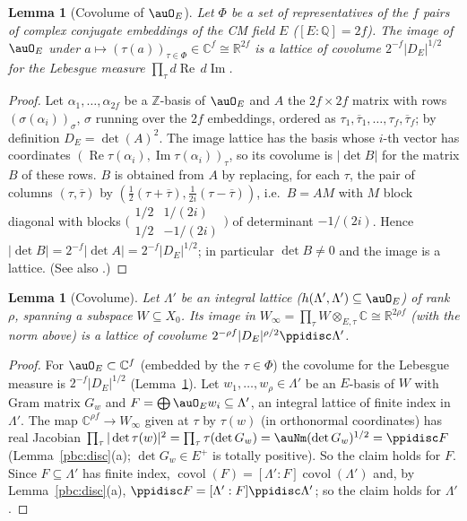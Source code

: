 \documentclass[10pt]{amsart}
\newtheorem{lemma}[theorem]{Lemma}
\theoremstyle{definition}
\theoremstyle{remark}
\newcommand{\C}{\mathbb C}
\newcommand{\R}{\mathbb R}
\newcommand{\Z}{\mathbb Z}
\newcommand{\Q}{\mathbb Q}
\newcommand{\Rel}{\operatorname{Re}}
\newcommand{\Iml}{\operatorname{Im}}
\providecommand{\auPl}{\Phi}
\providecommand{\aubar}[1]{\overline{#1}}
\begin{document}
\begin{lemma}[Covolume of $\auO_E$]\label{pbc:tb-covol}
Let $\auPl$ be a set of representatives of the $f$ pairs of complex conjugate embeddings of the CM
field $E$ ($[E:\Q]=2f$). The image of $\auO_E$ under $a\mapsto(\tau(a))_{\tau\in\auPl}\in\C^f\cong\R^{2f}$
is a lattice of covolume $2^{-f}|D_E|^{1/2}$ for the Lebesgue measure $\prod_\tau d\Rel\,d\Iml$.
\end{lemma}
\begin{proof}
Let $\alpha_1,\dots,\alpha_{2f}$ be a $\Z$-basis of $\auO_E$ and $A$ the $2f\times2f$ matrix with rows
$(\sigma(\alpha_i))_\sigma$, $\sigma$ running over the $2f$ embeddings, ordered as $\tau_1,\aubar\tau_1,\dots,
\tau_f,\aubar\tau_f$; by definition $D_E=\det(A)^2$. The image lattice has the basis whose $i$-th vector has
coordinates $(\Rel\tau(\alpha_i),\Iml\tau(\alpha_i))_\tau$, so its covolume is $|\det B|$ for the matrix
$B$ of these rows. $B$ is obtained from $A$ by replacing, for each $\tau$, the pair of columns
$(\tau,\aubar\tau)$ by $(\tfrac12(\tau+\aubar\tau),\tfrac1{2i}(\tau-\aubar\tau))$, i.e.\ $B=AM$ with $M$
block diagonal with blocks $\bigl(\begin{smallmatrix}1/2&1/(2i)\\1/2&-1/(2i)\end{smallmatrix}\bigr)$
of determinant $-1/(2i)$. Hence $|\det B|=2^{-f}|\det A|=2^{-f}|D_E|^{1/2}$; in particular $\det B\ne0$
and the image is a lattice. (See also \cite[Chapter~I, (5.1) and Proposition~(5.2)]{Neukirch}.)
\end{proof}

\begin{lemma}[Covolume]\label{pbc:covol}
Let $\Lambda'$ be an integral lattice ($h(\Lambda',\Lambda')\subseteq\auO_E$) of rank $\rho$, spanning a subspace $W\subseteq X_0$. Its image in $W_\infty=\prod_\tau
W\otimes_{E,\tau}\C\cong\R^{2\rho f}$ (with the norm above) is a lattice of covolume $2^{-\rho f}|D_E|^{\rho/2}
\ppidisc\Lambda'$.
\end{lemma}
\begin{proof}
For $\auO_E\subset\C^f$ (embedded by the $\tau\in\auPl$) the covolume for the Lebesgue measure is
$2^{-f}|D_E|^{1/2}$ (Lemma~\ref{pbc:tb-covol}). Let $w_1,\dots,w_\rho\in\Lambda'$ be an $E$-basis of $W$ with Gram
matrix $G_w$ and $F=\bigoplus\auO_Ew_i\subseteq\Lambda'$, an integral lattice of finite index in $\Lambda'$. The map $\C^{\rho f}\to W_\infty$ given at $\tau$ by $\tau(w)$ (in
orthonormal coordinates) has real Jacobian $\prod_\tau|\det\tau(w)|^2=\prod_\tau\tau(\det G_w)=\auNm(\det
G_w)^{1/2}=\ppidisc F$ (Lemma~\ref{pbc:disc}(a); $\det G_w\in E^+$ is totally positive). So the claim holds
for $F$. Since $F\subseteq\Lambda'$ has finite index, $\operatorname{covol}(F)=[\Lambda':F]\operatorname{covol}(\Lambda')$
and, by Lemma~\ref{pbc:disc}(a), $\ppidisc F=[\Lambda':F]\ppidisc\Lambda'$; so the claim holds for $\Lambda'$.
\end{proof}
\end{document}
